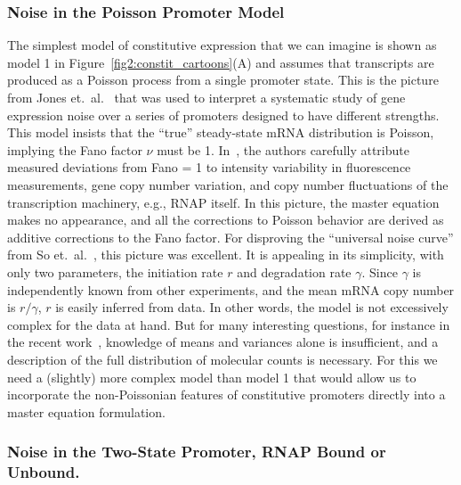 \subsubsection{Noise in the Poisson Promoter Model}

The simplest model of constitutive expression that we can imagine is shown as
model 1 in Figure~\ref{fig2:constit_cartoons}(A) and assumes that transcripts are
produced as a Poisson process from a single promoter state. This is the picture
from Jones et.\ al.~\cite{Jones2014} that was used to interpret a systematic
study of gene expression noise over a series of promoters designed to have
different strengths. This model insists that the ``true'' steady-state mRNA
distribution is Poisson, implying the Fano factor $\nu$ must be 1.
In~\cite{Jones2014}, the authors carefully attribute measured deviations from
Fano = 1 to intensity variability in fluorescence measurements, gene copy number
variation, and copy number fluctuations of the transcription machinery, e.g.,
RNAP itself. In this picture, the master equation makes no appearance, and all
the corrections to Poisson behavior are derived as additive corrections to the
Fano factor. For disproving the ``universal noise curve'' from So et.\
al.~\cite{So2011}, this picture was excellent. It is appealing in its simplicity,
with only two parameters, the initiation rate $r$ and degradation rate $\gamma$.
Since $\gamma$ is independently known from other experiments, and the mean mRNA
copy number is $r/\gamma$, $r$ is easily inferred from data. In other words, the
model is not excessively complex for the data at hand. But for many interesting
questions, for instance in the recent work~\cite{Razo-Mejia2020}, knowledge of
means and variances alone is insufficient, and a description of the full
distribution of molecular counts is necessary. For this we need a (slightly)
more complex model than model 1 that would allow us to incorporate the
non-Poissonian features of constitutive promoters directly into a master
equation formulation.

\subsubsection{Noise in the Two-State Promoter, RNAP Bound or Unbound.}

